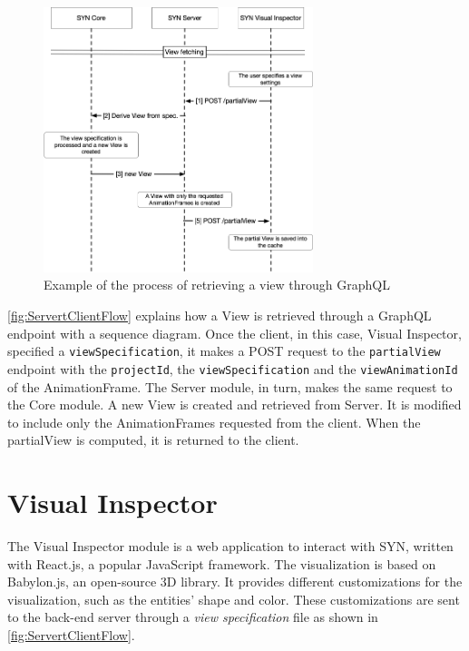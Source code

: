 \clearpage
\begin{figure}
    \center
    \includegraphics[width=0.7\textwidth]{ServertClientFlow.jpg}
    \caption{Example of the process of retrieving a view through GraphQL}
    \label{fig:ServertClientFlow}
\end{figure}


\autoref{fig:ServertClientFlow} explains how a View is retrieved through a GraphQL endpoint with a sequence diagram. Once the client, in this case, Visual Inspector, specified a \texttt{viewSpecification}, it makes a POST request to the 
\texttt{partialView} endpoint with the \texttt{projectId}, the \texttt{viewSpecification} and the \texttt{viewAnimationId} of the AnimationFrame. The Server module, in turn, makes the same request to the Core module. A new View is created and retrieved from Server. It is modified to include only the AnimationFrames requested from the client. When the partialView is computed, it is returned to the client. 


\section{Visual Inspector}
\label{s:SYNDebugger}

The Visual Inspector module is a web application to interact with SYN, written with React.js, a popular JavaScript framework. 
The visualization is based on Babylon.js, an open-source 3D library. 
It provides different customizations for the visualization, such as the entities' shape and color. 
These customizations are sent to the back-end server through a {\em view specification} file as shown in \autoref{fig:ServertClientFlow}. 

